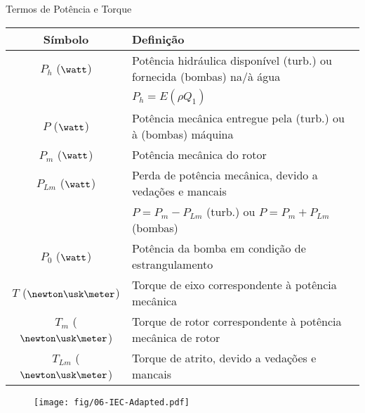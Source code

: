     \begin{frame}{Termos de Potência e Torque}\vspace*{-1em}
        \setlength{\tabcolsep}{2mm}
        \noindent\begin{longtable}{cp{110mm}}
            \alert{Símbolo} & \alert{Definição} \\
            \hline
            $P_h$ ($\watt$) &
            Potência hidráulica disponível (turb.) ou fornecida (bombas) na/à água \\
            & \alert{$P_h = E(\rho Q_1)$} \\
            $P$ ($\watt$) &
            Potência mecânica entregue pela (turb.) ou à (bombas) máquina \\
            $P_m$ ($\watt$) &
            Potência mecânica do rotor \\
            $P_{Lm}$ ($\watt$) &
            Perda de potência mecânica, devido a vedações e mancais \\
            & \alert{$P = P_m - P_{Lm}$} (turb.) ou \alert{$P = P_m + P_{Lm}$} (bombas) \\
            $P_0$ ($\watt$) &
            Potência da bomba em condição de estrangulamento \\
            $T$ ($\newton\usk\meter$) &
            Torque de eixo correspondente à potência mecânica \\
            $T_m$ ($\newton\usk\meter$) &
            Torque de rotor correspondente à potência mecânica de rotor \\
            $T_{Lm}$ ($\newton\usk\meter$) &
            Torque de atrito, devido a vedações e mancais \\
            \hline
        \end{longtable}
    \end{frame}

    \begin{frame}\vspace*{-1em}
        \begin{center}
            \begin{figure}
                \texttt{[image: fig/06-IEC-Adapted.pdf]}
            \end{figure}
        \end{center}
    \end{frame}

